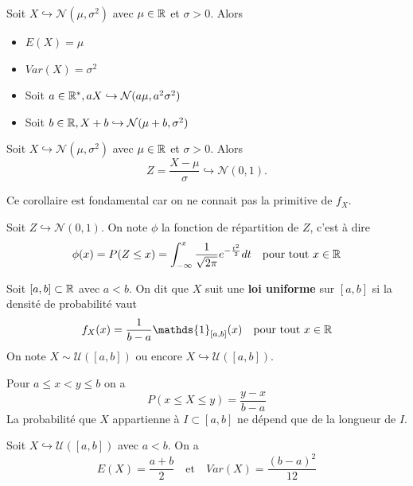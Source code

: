 \documentclass[a4paper,12pt]{article}
\begin{document}
\begin{theoreme}{}{}
    Soit $X \hookrightarrow \mathcal{N}(\mu, \sigma^2)$ avec $\mu \in \mathbb{R}$ et $\sigma > 0$. Alors
    \begin{itemize}
        \item $E(X) = \mu$
        \item $Var(X) = \sigma^2$
        \item Soit $a \in \mathbb{R}^*, aX \hookrightarrow \mathcal{N}(a\mu, a^2\sigma^2)$
        \item Soit $b \in \mathbb{R}, X + b \hookrightarrow \mathcal{N}(\mu + b, \sigma^2)$
    \end{itemize}
\end{theoreme}

\begin{corollaire}{}{}
    Soit $X \hookrightarrow \mathcal{N}(\mu, \sigma^2)$ avec $\mu \in \mathbb{R}$ et $\sigma > 0$. Alors
    $$
    Z = \dfrac{X - \mu}{\sigma} \hookrightarrow \mathcal{N}(0, 1).
    $$
\end{corollaire}

\begin{remarque}
    Ce corollaire est fondamental car on ne connait pas la primitive de $f_X$. 
\end{remarque}

\begin{definition}
    Soit $Z \hookrightarrow \mathcal{N}(0, 1)$. On note $\phi$ la fonction de répartition de $Z$, c'est à dire
    $$
    \phi(x) = P(Z \leq x) = \int_{-\infty}^x \dfrac{1}{\sqrt{2\pi}} e^{-\frac{t^2}{2}} dt \quad \text{pour tout } x \in \mathbb{R}
    $$
\end{definition}

\begin{definition}
    Soit $[a, b] \subset \mathbb{R}$ avec $a < b$. On dit que $X$ suit une \textbf{loi uniforme} sur $[a, b]$ si la densité de probabilité vaut
    $$
    f_X(x) = \dfrac{1}{b - a} \mathds{1}_{[a, b]}(x) \quad \text{pour tout } x \in \R
    $$
    On note $X \sim \mathcal{U}([a, b])$ ou encore $X \hookrightarrow \mathcal{U}([a, b])$.
\end{definition}

\begin{remarque}
    Pour $a \leq x < y \leq b$ on a
    $$
    P(x \leq X \leq y) = \dfrac{y - x}{b - a}
    $$
    La probabilité que $X$ appartienne à $I \subset [a, b]$ ne dépend que de la longueur de $I$.
\end{remarque}

\begin{proposition}{}{}
    Soit $X \hookrightarrow \mathcal{U}([a, b])$ avec $a < b$. On a
    $$
    E(X) = \dfrac{a + b}{2} \quad \text{et} \quad Var(X) = \dfrac{(b - a)^2}{12}
    $$
\end{proposition}
\end{document}
